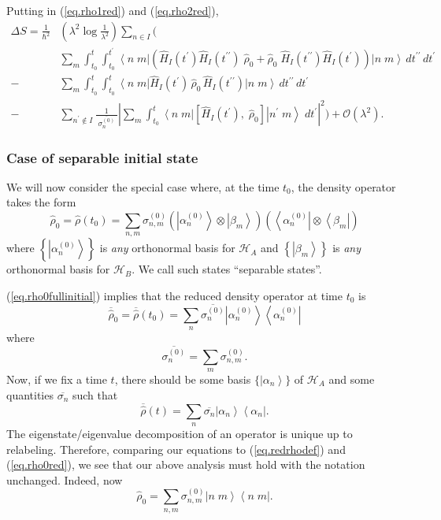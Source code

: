 \documentclass[11pt]{article}
\newcommand{\Od}[1]{\mathcal{O}{\left(#1\right)}}
\newcommand{\bra}[1]{\left\langle#1\right|}
\newcommand{\ket}[1]{\left|#1\right\rangle}
\newcommand{\hilb}{\mathcal{H}}
\newcommand{\op}[1]{\hat{#1}}
\newcommand{\bket}[2]{\ket{#1\;#2}}
\newcommand{\bbra}[2]{\bra{#1\;#2}}
\theoremstyle{theorem}
\theoremstyle{remark}
\theoremstyle{step}
\theoremstyle{gap}
\begin{document}
Putting in (\ref{eq.rho1red}) and (\ref{eq.rho2red}),
\begin{align}\label{eq.entropyresultwithrho2}
\Delta S = \frac{1}{\hbar^2}&\left(\lambda^2 \log\frac{1}{\lambda^2}\right)\sum_{n \in I} \Bigg( \\
& \sum_m\int_{t_0}^t \int_{t_0}^{t^\prime} \bbra{n}{m} \left( \op{H}_I (t^\prime) \op{H}_I(t^{\prime\prime}) \;\op{\rho}_0 + \op{\rho}_0\; \op{H}_I (t^{\prime\prime}) \op{H}_I(t^{\prime}) \right) \bket{n}{m}\,dt^{\prime\prime}\,dt^\prime \nonumber\\
-& \sum_m\int_{t_0}^t \int_{t_0}^{t} \bbra{n}{m}\op{H}_I (t^\prime) \,\op{\rho}_0\, \op{H}_I (t^{\prime\prime})\bket{n}{m}\,dt^{\prime\prime}\,dt^\prime \nonumber\\
-& \sum_{n^\prime \not \in I} \frac{1}{\;\overline{\sigma_n^{(0)}}\;} \left|\sum_m\int_{t_0}^t \bbra{n}{m} \left[\op{H}_I(t^\prime),\; \op{\rho}_0 \right] \bket{n^\prime}{m}\;dt^\prime \right|^2
\Bigg) + \Od{\lambda^2}. \nonumber
\end{align}

\subsubsection{Case of separable initial state}

We will now consider the special case where, at the time \(t_0\), the density operator takes the form
\begin{equation}\label{eq.rho0fullinitial}
\op{\rho}_0 = \op{\rho}\left(t_0\right) = \sum_{n,m} \sigma_{n,m}^{(0)} \left(\ket{\alpha_n^{(0)}}\otimes\ket{\beta_m}\right) \left(\bra{\alpha_n^{(0)}}\otimes\bra{\beta_m}\right)
\end{equation}
where \(\left\{\ket{\alpha_n^{(0)}}\right\}\) is \emph{any} orthonormal basis for \(\hilb_A\) and \(\left\{\ket{\beta_m}\right\}\) is \emph{any} orthonormal basis for \(\hilb_B\). We call such states ``separable states''.

(\ref{eq.rho0fullinitial}) implies that the reduced density operator at time \(t_0\) is
\[
\overline{\op{\rho}}_0 = \overline{\op{\rho}}\left(t_0\right) = \sum_n \overline{\sigma_{n}^{(0)}} \ket{\alpha_n^{(0)}}\bra{\alpha_n^{(0)}}
\]
where
\[
\overline{\sigma_n^{(0)}} = \sum_m \sigma_{n,m}^{(0)}.
\]
Now, if we fix a time \(t\), there should be some basis \(\{\ket{\alpha_n}\}\) of \(\hilb_A\) and some quantities \(\overline{\sigma_n}\) such that
\[
\overline{\op{\rho}}(t) = \sum_n \overline{\sigma_n} \ket{\alpha_n}\bra{\alpha_n}.
\]
The eigenstate/eigenvalue decomposition of an operator is unique up to relabeling. Therefore, comparing our equations to (\ref{eq.redrhodef}) and (\ref{eq.rho0red}), we see that our above analysis must hold with the notation unchanged. Indeed, now
\begin{equation}
\label{eq.rho0full}
\op{\rho}_0 = \sum_{n,m} \sigma_{n,m}^{(0)} \bket{n}{m}\bbra{n}{m}.
\end{equation}
\end{document}
